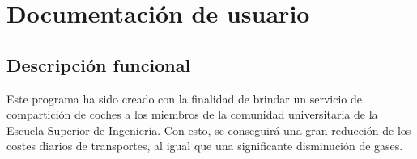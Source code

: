 
\section{Documentación de usuario}

\subsection{Descripción funcional}

Este programa ha sido creado con la finalidad de brindar un servicio de compartición de coches a los miembros de la comunidad universitaria de la Escuela Superior de Ingeniería. 
Con esto, se conseguirá una gran reducción de los costes diarios de transportes, al igual que una significante disminución de gases.

\bigskip

